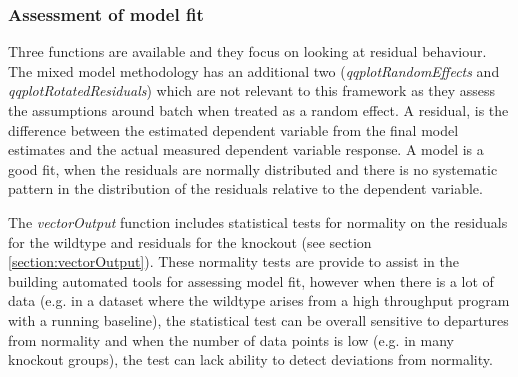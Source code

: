 \documentclass[12pt,a4paper]{article}
\begin{document}
\subsubsection{Assessment of model fit}
Three functions are available and they focus on looking at residual behaviour. The mixed model methodology has an additional two (\textit{qqplotRandomEffects} and \textit{qqplotRotatedResiduals}) which are not relevant to this framework as they assess the assumptions around batch when treated as a random effect. A residual, is the difference between the estimated dependent variable from the final model estimates and the actual measured dependent variable response. A model is a good fit, when the residuals are normally distributed and there is no systematic pattern in the distribution of the residuals relative to the dependent variable.

The \textit{vectorOutput} function includes statistical tests for normality on the residuals for the wildtype and residuals for the knockout (see section \ref{section:vectorOutput}). These normality tests are provide to assist in the building automated tools for assessing model fit, however when there is a lot of data (e.g. in a dataset where the wildtype arises from a high throughput program with a running baseline), the statistical test can be overall sensitive to departures from normality and when the number of data points is low (e.g. in many knockout groups), the test can lack ability to detect deviations from normality.
\end{document}
